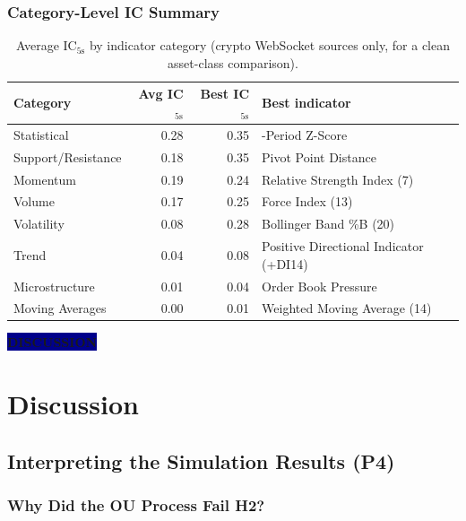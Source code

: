 \documentclass[12pt,a4paper]{article}
\theoremstyle{definition}
\theoremstyle{remark}
\newcommand{\IC}{\mathrm{IC}}
\newcommand{\sectionlabel}[1]{%
  \begin{center}
    \colorbox{darkblue}{\color{white}\bfseries\large\quad #1 \quad}
  \end{center}
  \vspace{4pt}
}
\begin{document}
\subsubsection{Category-Level IC Summary}

\begin{table}[H]
\centering
\caption{Average $\IC_{5\text{s}}$ by indicator category (crypto
  WebSocket sources only, for a clean asset-class comparison).}
\label{tab:catIC}
\begin{tabular}{lrr>{\RaggedRight\arraybackslash}p{5.5cm}}
\toprule
\textbf{Category} & \textbf{Avg IC$_{5\text{s}}$}
  & \textbf{Best IC$_{5\text{s}}$} & \textbf{Best indicator} \\
\midrule
Statistical        & 0.28 & 0.35 & 10-Period Z-Score \\
Support/Resistance & 0.18 & 0.35 & Pivot Point Distance \\
Momentum           & 0.19 & 0.24 & Relative Strength Index (7) \\
Volume             & 0.17 & 0.25 & Force Index (13) \\
Volatility         & 0.08 & 0.28 & Bollinger Band \%B (20) \\
Trend              & 0.04 & 0.08 & Positive Directional Indicator (+DI14) \\
Microstructure     & 0.01 & 0.04 & Order Book Pressure \\
Moving Averages    & 0.00 & 0.01 & Weighted Moving Average (14) \\
\bottomrule
\end{tabular}
\end{table}

\newpage
\sectionlabel{DISCUSSION}

\section{Discussion}
\label{sec:discussion}

\subsection{Interpreting the Simulation Results (P4)}

\subsubsection{Why Did the OU Process Fail H2?}
\end{document}

